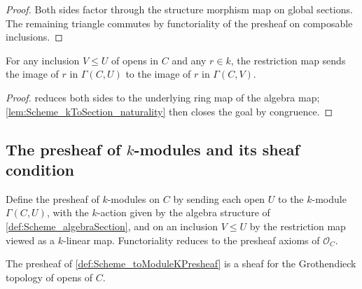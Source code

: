 \begin{proof}
  
  \leanok
  Both sides factor through the structure morphism map on global sections. The remaining triangle commutes by functoriality of the presheaf on composable inclusions.
\end{proof}

\begin{lemma}
  \label{lem:Scheme_algebraMap_naturality}

  For any inclusion \(V \le U\) of opens in \(C\) and any \(r \in k\), the restriction map sends the image of \(r\) in \(\Gamma(C, U)\) to the image of \(r\) in \(\Gamma(C, V)\).
\end{lemma}

\begin{proof}
  
  \leanok
   reduces both sides to the underlying ring map of the algebra map; \cref{lem:Scheme_kToSection_naturality} then closes the goal by congruence.
\end{proof}

\subsection{The presheaf of \(k\)-modules and its sheaf condition}

\begin{definition}
  \label{def:Scheme_toModuleKPresheaf}

  Define the presheaf of \(k\)-modules on \(C\) by sending each open \(U\) to the \(k\)-module \(\Gamma(C, U)\), with the \(k\)-action given by the algebra structure of \cref{def:Scheme_algebraSection}, and on an inclusion \(V \le U\) by the restriction map viewed as a \(k\)-linear map. Functoriality reduces to the presheaf axioms of \(\mathcal O_C\).
\end{definition}

\begin{theorem}
  \label{thm:Scheme_toModuleKPresheaf_isSheaf}

  The presheaf of \cref{def:Scheme_toModuleKPresheaf} is a sheaf for the Grothendieck topology of opens of \(C\).
\end{theorem}

